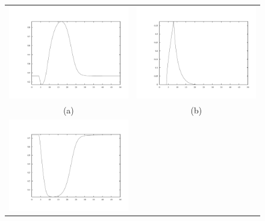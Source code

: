 \documentclass{article}
\begin{document}
\begin{center}
  \begin{figure}
    \begin{tabular}{cc}
      \includegraphics[scale = 0.3, angle = 0]{carbonTime.pdf} &
      \includegraphics[scale = 0.3, angle = 0]{antiTime.pdf}  \\
      (a) & (b) \\
      \includegraphics[scale = 0.3, angle = 0]{bactTime.pdf} &

\end{tabular}
\end{figure}
\end{center}
\end{document}
